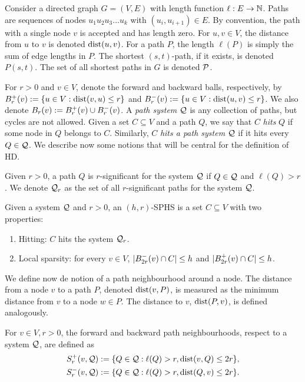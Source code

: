 Consider a directed graph $G=(V,E)$ with length function $\ell:E\to \mathbb{N}$.
Paths are sequences of nodes $u_1u_2u_3\ldots u_k$ with $(u_i,u_{i+1})\in E$.
By convention, the path with a single node $v$ is accepted and has length zero.
For $u,v\in V$, the distance from $u$ to $v$ is denoted $\text{dist}(u,v)$.
For a path $P$, the length $\ell(P)$ is simply the sum of edge lengths in $P$.
The shortest $(s,t)$-path, if it exists, is denoted $P(s,t)$.
The set of all shortest paths in $G$ is denoted $\mathcal{P}$.

For $r>0$ and $v\in V$, denote the forward and backward balls, respectively, by $B^+_r(v):=\{u\in V: \text{dist}(v,u)\leq r\}$ and $B^-_r(v):=\{u\in V: \text{dist}(u,v)\leq r\}$.
We also denote $B_r(v):=B^+_r(v)\cup B^-_r(v)$.
A \emph{path system} $\mathcal{Q}$ is any collection of paths, but cycles are not allowed.
Given a set $C\subseteq V$ and a path $Q$, we say that $C$ \emph{hits} $Q$ if some node in $Q$ belongs to $C$.
Similarly, $C$ \emph{hits a path system} $\mathcal{Q}$ if it hits every $Q\in\mathcal{Q}$.
We describe now some notions that will be central for the definition of HD.

\begin{definition}
Given $r>0$, a path $Q$ is $r$-significant for the system $\mathcal{Q}$ if $Q\in\mathcal{Q}$ and $\ell(Q)>r$.
We denote $\mathcal{Q}_r$ as the set of all $r$-significant paths for the system $\mathcal{Q}$.
\end{definition}

\begin{definition}
Given a system $\mathcal{Q}$ and $r>0$, an $(h,r)$-SPHS is a set $C\subseteq V$ with two properties: 
\begin{enumerate}
\item Hitting: $C$ hits the system $\mathcal{Q}_r$.
\item Local sparsity: for every $v\in V$, $\lvert B^-_{2r}(v)\cap C\rvert\leq h$ and $\lvert B^+_{2r}(v)\cap C\rvert\leq h$.
\end{enumerate}
\end{definition}

We define now de notion of a path neighbourhood around a node.
The distance from a node $v$ to a path $P$, denoted $\text{dist}(v,P)$, is measured as the minimum distance from $v$ to a node $w\in P$.
The distance to $v$, $\text{dist}(P,v)$, is defined analogously.

\begin{definition}
For $v\in V, r>0$, the forward and backward path neighbourhoods, respect to a system $\mathcal{Q}$, are defined as 
\begin{align*}
S_r^+(v,\mathcal{Q}) &:=\{Q\in\mathcal{Q}:\ell(Q)>r,  \text{dist}(v,Q)\leq 2r \}, \\  
S_r^-(v,\mathcal{Q}) &:=\{Q\in\mathcal{Q}:\ell(Q)>r,  \text{dist}(Q,v)\leq 2r \}.
\end{align*}
\end{definition}

